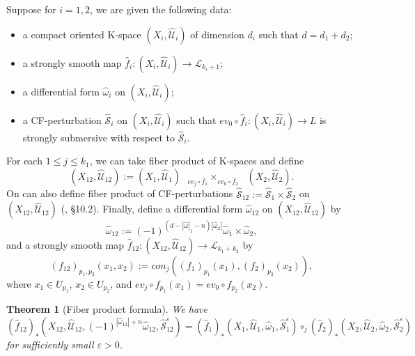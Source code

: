 \documentclass[a4paper]{article}
\newtheorem{theorem}{Theorem}
\numberwithin{equation}{section}
\begin{document}
Suppose for $i=1,2$, we are given the following data:
\begin{itemize}
	\item a compact oriented K-space $(X_i,\widehat{\mathcal{U}}_i)$ of dimension $d_i$ such that $d=d_1+d_2$;
	\item a strongly smooth map $\hat{f}_i:(X_i,\widehat{\mathcal{U}}_i)\rightarrow\mathcal{L}_{k_i+1}$;
	\item a differential form $\hat{\omega}_i$ on $(X_i,\widehat{\mathcal{U}}_i)$;
	\item a CF-perturbation $\widehat{\mathcal{S}}_i$ on $(X_i,\widehat{\mathcal{U}}_i)$ such that $\mathit{ev}_0\circ\hat{f}_i:(X_i,\widehat{\mathcal{U}}_i)\rightarrow L$ is strongly submersive with respect to $\widehat{\mathcal{S}}_i$.
\end{itemize}
For each $1\leq j\leq k_1$, we can take fiber product of K-spaces and define
\begin{equation}
(X_{12},\widehat{\mathcal{U}}_{12}):=(X_1,\widehat{\mathcal{U}}_1)\textrm{ }{{}_{\mathit{ev}_j\circ\hat{f}_1}\times_{\mathit{ev}_0\circ\hat{f}_2}}\textrm{ }(X_2,\widehat{\mathcal{U}}_2).
\end{equation}
On can also define fiber product of CF-perturbations $\widehat{\mathcal{S}}_{12}:=\widehat{\mathcal{S}}_1\times\widehat{\mathcal{S}}_2$ on $(X_{12},\widehat{\mathcal{U}}_{12})$ (\cite{fooo4}, \S10.2). Finally, define a differential form $\hat{\omega}_{12}$ on $(X_{12},\widehat{\mathcal{U}}_{12})$ by
\begin{equation}
\hat{\omega}_{12}:=(-1)^{(d-|\hat{\omega}|_1-n)|\hat{\omega}_2|}\hat{\omega}_1\times\hat{\omega}_2,
\end{equation}
and a strongly smooth map $\hat{f}_{12}:(X_{12},\widehat{\mathcal{U}}_{12})\rightarrow\mathcal{L}_{k_1+k_2}$ by
\begin{equation}
(f_{12})_{p_1,p_2}(x_1,x_2):=\mathit{con}_j\left((f_1)_{p_1}(x_1),(f_2)_{p_2}(x_2)\right),
\end{equation}
where $x_1\in U_{p_1}$, $x_2\in U_{p_2}$, and $\mathit{ev}_j\circ f_{p_1}(x_1)=\mathit{ev}_0\circ f_{p_2}(x_2)$.

\begin{theorem}[Fiber product formula]\label{theorem:fp}
We have
\begin{equation}
(\hat{f}_{12})_\ast\left(X_{12},\widehat{\mathcal{U}}_{12},(-1)^{|\hat{\omega}_{12}|+n}\hat{\omega}_{12},\widehat{\mathcal{S}}_{12}^\varepsilon\right)=(\hat{f}_1)_\ast(X_1,\widehat{\mathcal{U}}_1,\hat{\omega}_1,\widehat{\mathcal{S}}_1^\varepsilon)\circ_j(\hat{f}_2)_\ast(X_2,\widehat{\mathcal{U}}_2,\hat{\omega}_2,\widehat{\mathcal{S}}_2^\varepsilon)
\end{equation}
for sufficiently small $\varepsilon>0$.
\end{theorem}
\end{document}
